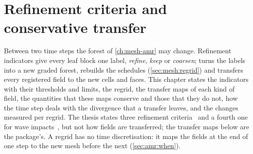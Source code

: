 \chapter{Refinement criteria and conservative transfer}\label{ch:amr-criteria-transfer}
Between two time steps the forest of \cref{ch:mesh-amr} may change.
Refinement indicators give every leaf block one label, \emph{refine},
\emph{keep} or \emph{coarsen};  turns the labels into a new
graded forest, rebuilds the schedules (\cref{sec:mesh:regrid}) and transfers
every registered field to the new cells and faces. This chapter states the
indicators with their thresholds and limits, the regrid, the transfer maps of
each kind of field, the quantities that these maps conserve and those that
they do not, how the time step deals with the divergence that a transfer
leaves, and the changes measured per regrid. The thesis states three
refinement criteria~ and a fourth one for wave
impacts~, but not how fields are transferred; the transfer
maps below are the package's. A regrid has no time discretisation: it maps
the fields at the end of one step to the new mesh before the next
(\cref{sec:amr:when}).

